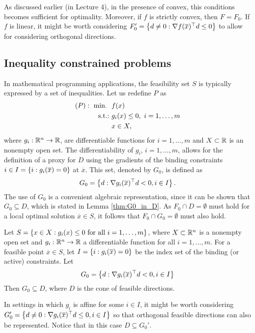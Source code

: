 As discussed earlier (in Lecture 4), in the presence of convex, this conditions becomes sufficient for optimality. Moreover, if $f$ is strictly convex, then $F = F_0$. If $f$ is linear, it might be worth considering $F_0' = \left\{ d \neq 0 : \nabla f (\overline{x})^\top d \leq 0 \right \}$ to allow for considering orthogonal directions.

\subsection{Inequality constrained problems}

In mathematical programming applications, the feasibility set $S$ is typically expressed by a set of inequalities. Let us redefine $P$ as
%
\begin{align*}
	(P) :~ \mathop{\text{min.~}} \ & f(x)\\
	\mathop{\text{s.t.:~}}  &g_i(x) \leq 0, \ i=1,\dots,m\\
	&x \in X,
\end{align*}
%
where $g_i: \mathbb{R}^n \to \mathbb{R}$, are differentiable functions for $i = 1, \dots, m$ and $X \subset \mathbb{R}$ is an nonempty open set. The differentiability of $g_i$, $i=1, \dots, m$, allows for the definition of a proxy for $D$ using the gradients of the binding constraints $i \in I = \left\{ i:g_i(\overline{x}) = 0 \right \}$ at $\overline{x}$. This set, denoted by $G_0$, is defined as
%
\begin{align*}
	G_0 = \left\{ d : \nabla g_i(\overline{x})^\top d < 0, i \in I \right \}.
\end{align*}
%
The use of $G_0$ is a convenient algebraic representation, since it can be shown that $G_0 \subseteq D$, which is stated in Lemma \ref{thm:G0_in_D}. As $F_0 \cap D = \emptyset$ must hold for a local optimal solution $\overline{x}\in S$, it follows that $F_0 \cap G_0 = \emptyset$ must also hold.
%
\begin{lemma}\label{thm:G0_in_D}
Let $S = \left\{  x \in X : g_i(x) \leq 0 \text{ for all } i=1,\dots,m \right \}$, where $X \subset \mathbb{R}^n$ is a nonempty open set and $g_i : \mathbb{R}^n \rightarrow \mathbb{R}$ a differentiable function for all $i = 1,\dots,m$. For a feasible point $\overline{x} \in S$, let $I = \left\{ i:g_i(\overline{x}) = 0 \right \}$ be the index set of the binding (or active) constraints. Let
$$ G_0 = \left\{ d : \nabla g_i(\overline{x})^\top d < 0, i \in I \right \}$$
Then $G_0 \subseteq D$, where $D$ is the cone of feasible directions.
\end{lemma}
%
In settings in which $g_i$ is affine for some $i \in I$, it might be worth considering \lb $G_0' = \left\{ d \neq 0: \nabla g_i (\overline{x})^\top d \leq 0, i \in I \right \}$ so that orthogonal feasible directions can also be represented. Notice that in this case $D \subseteq G_0'$.


